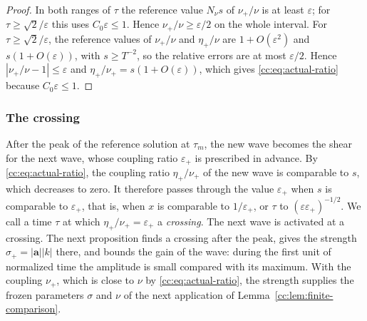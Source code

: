 \begin{proof}
In both ranges of $\tau$ the reference value $N_\nu s$ of $\nu_+/\nu$
is at least $\varepsilon$; for $\tau\ge\sqrt2/\varepsilon$ this uses
$C_0\varepsilon\le1$. Hence $\nu_+/\nu\ge\varepsilon/2$ on the whole
interval. For
$\tau\ge\sqrt2/\varepsilon$, the reference values of
$\nu_+/\nu$ and $\eta_+/\nu$ are $1+O(\varepsilon^2)$ and
$s(1+O(\varepsilon))$, with $s\ge T^{-2}$, so the relative errors are at
most $\varepsilon/2$. Hence
$|\nu_+/\nu-1|\le\varepsilon$ and $\eta_+/\nu_+=s(1+O(\varepsilon))$,
which gives \eqref{cc:eq:actual-ratio} because $C_0\varepsilon\le1$.
\end{proof}

\subsubsection{The crossing}
After the peak of the reference solution at $\tau_m$, the new wave
becomes the shear for the next wave, whose coupling ratio
$\varepsilon_+$ is prescribed in advance. By
\eqref{cc:eq:actual-ratio}, the coupling ratio $\eta_+/\nu_+$ of the
new wave is comparable to $s$, which decreases to zero. It therefore
passes through the value $\varepsilon_+$ when $s$ is comparable to
$\varepsilon_+$, that is, when $x$ is comparable to $1/\varepsilon_+$,
or $\tau$ to $(\varepsilon\varepsilon_+)^{-1/2}$.
We call a time $\tau$ at which $\eta_+/\nu_+=\varepsilon_+$ a
\emph{crossing}. The next wave is activated at a crossing. The next
proposition finds a crossing after the peak, gives the strength
$\sigma_+=|\mathbf a||k|$ there, and bounds the gain of the wave:
during the first unit of normalized time the amplitude is small
compared with its maximum. With the
coupling $\nu_+$, which is close to $\nu$ by
\eqref{cc:eq:actual-ratio}, the strength supplies the frozen parameters
$\sigma$ and $\nu$ of the next application of
Lemma~\ref{cc:lem:finite-comparison}.

